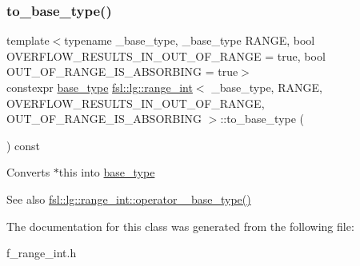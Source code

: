 \subsubsection{\texorpdfstring{to\_base\_type()}{to\_base\_type()}}
{\footnotesize\ttfamily template$<$typename \+\_\+base\+\_\+type, \+\_\+base\+\_\+type R\+A\+N\+GE, bool O\+V\+E\+R\+F\+L\+O\+W\+\_\+\+R\+E\+S\+U\+L\+T\+S\+\_\+\+I\+N\+\_\+\+O\+U\+T\+\_\+\+O\+F\+\_\+\+R\+A\+N\+GE = true, bool O\+U\+T\+\_\+\+O\+F\+\_\+\+R\+A\+N\+G\+E\+\_\+\+I\+S\+\_\+\+A\+B\+S\+O\+R\+B\+I\+NG = true$>$ \\
constexpr \mbox{\hyperlink{classfsl_1_1lg_1_1range__int_a901feb77897b3353d554f06d4d6a8f4a}{base\+\_\+type}} \mbox{\hyperlink{classfsl_1_1lg_1_1range__int}{fsl\+::lg\+::range\+\_\+int}}$<$ \+\_\+base\+\_\+type, R\+A\+N\+GE, O\+V\+E\+R\+F\+L\+O\+W\+\_\+\+R\+E\+S\+U\+L\+T\+S\+\_\+\+I\+N\+\_\+\+O\+U\+T\+\_\+\+O\+F\+\_\+\+R\+A\+N\+GE, O\+U\+T\+\_\+\+O\+F\+\_\+\+R\+A\+N\+G\+E\+\_\+\+I\+S\+\_\+\+A\+B\+S\+O\+R\+B\+I\+NG $>$\+::to\+\_\+base\+\_\+type (\begin{DoxyParamCaption}{ }\end{DoxyParamCaption}) const\hspace{0.3cm}{\ttfamily [inline]}}

Converts $\ast$this into \mbox{\hyperlink{classfsl_1_1lg_1_1range__int_a901feb77897b3353d554f06d4d6a8f4a}{base\+\_\+type}} \begin{DoxySeeAlso}{See also}
\mbox{\hyperlink{classfsl_1_1lg_1_1range__int_a08cd60e0694d2a7a29d86221dc6a702b}{fsl\+::lg\+::range\+\_\+int\+::operator \+\_\+base\+\_\+type()}} 
\end{DoxySeeAlso}


The documentation for this class was generated from the following file\+:\begin{DoxyCompactItemize}
\item 
f\+\_\+range\+\_\+int.\+h\end{DoxyCompactItemize}
